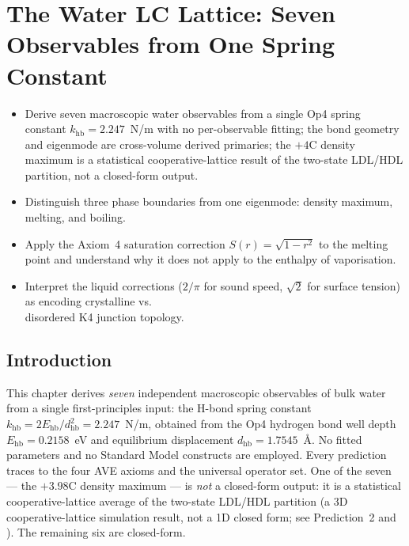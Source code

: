 \chapter{The Water LC Lattice: Seven Observables from One Spring Constant}
\label{ch:water_lc_lattice}


\begin{objectivebox}
\begin{itemize}
    \item Derive seven macroscopic water observables from a single Op4 spring constant $k_{\text{hb}} = 2.247$~N/m with no per-observable fitting; the bond geometry and eigenmode are cross-volume derived primaries; the $+4$\textdegree{}C density maximum is a statistical cooperative-lattice result of the two-state LDL/HDL partition, not a closed-form output.
    \item Distinguish three phase boundaries from one eigenmode: density maximum, melting, and boiling.
    \item Apply the Axiom~4 saturation correction $S(r) = \sqrt{1-r^2}$ to the melting point and understand why it does not apply to the enthalpy of vaporisation.
    \item Interpret the liquid corrections ($2/\pi$ for sound speed, $\sqrt{2}$ for surface tension) as encoding crystalline vs.\\ disordered K4 junction topology.
\end{itemize}
\end{objectivebox}

\section{Introduction}

This chapter derives \emph{seven} independent macroscopic observables of bulk water from a single first-principles input: the H-bond spring constant $k_\mathrm{hb} = 2E_\mathrm{hb}/d_\mathrm{hb}^2 = 2.247$~N/m, obtained from the Op4 hydrogen bond well depth $E_\mathrm{hb} = 0.2158$~eV and equilibrium displacement $d_\mathrm{hb} = 1.7545$~\AA.  No fitted parameters and no Standard Model constructs are employed. Every prediction traces to the four AVE axioms and the universal operator set. One of the seven --- the $+3.98$\textdegree{}C density maximum --- is \emph{not} a closed-form output: it is a statistical cooperative-lattice average of the two-state LDL/HDL partition (a 3D cooperative-lattice simulation result, not a 1D closed form; see Prediction~2 and ). The remaining six are closed-form.

